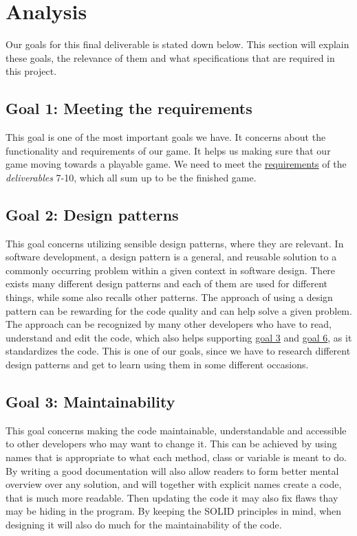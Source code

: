 \documentclass[../master.tex]{subfiles}
\begin{document}
\section{Analysis}
Our goals for this final deliverable is stated down below. This section will explain these goals, the relevance of them and what specifications that are required in this project.
\label{sec:Goals}

\subsection*{Goal 1: Meeting the requirements}
\label{sec:Goal1}
This goal is one of the most important goals we have. It concerns about the functionality and requirements of our game. It helps us making sure that our game moving towards a playable game. We need to meet the \hyperref[sec:Requirements]{requirements} of the \textit{deliverables} 7-10, which all sum up to be the finished game.

\subsection*{Goal 2: Design patterns}
This goal concerns utilizing sensible design patterns, where they are relevant. In software development, a design pattern is a general, and reusable solution to a commonly occurring problem within a given context in software design. There exists many different design patterns and each of them are used for different things, while some also recalls other patterns. The approach of using a design pattern can be rewarding for the code quality and can help solve a given problem. The approach can be recognized by many other developers who have to read, understand and edit the code, which also helps supporting \hyperref[sec:Goal3]{goal 3} and \hyperref[sec:Goal6]{goal 6}, as it standardizes the code. This is one of our goals, since we have to research different design patterns and get to learn using them in some different occasions.

\subsection*{Goal 3: Maintainability}
\label{sec:Goal3}
This goal concerns making the code maintainable, understandable and accessible to other developers who may want to change it. This can be achieved by using names that is appropriate to what each method, class or variable is meant to do. By writing a good documentation will also allow readers to form better mental overview over any solution, and will together with explicit names create a code, that is much more readable. Then updating the code it may also fix flaws thay may be hiding in the program. By keeping the SOLID principles in mind, when designing it will also do much for the maintainability of the code.\\
\end{document}
